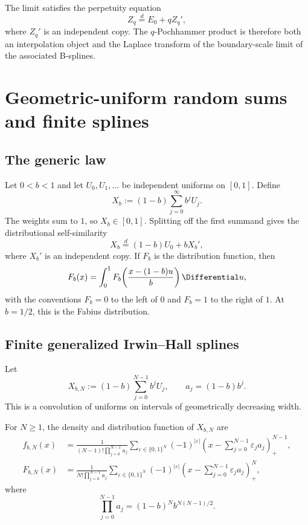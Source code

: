 \begin{remark}
The limit satisfies the perpetuity equation
\[
 Z_q\overset d=E_0+qZ_q',
\]
where $Z_q'$ is an independent copy.  The $q$-Pochhammer product is therefore
both an interpolation object and the Laplace transform of the boundary-scale
limit of the associated B-splines.
\end{remark}

\section{Geometric-uniform random sums and finite splines}
\label{g1:sec:uniform-sums}

\subsection{The generic law}

Let $0<b<1$ and let $U_0,U_1,\ldots$ be independent uniforms on $[0,1]$.
Define
\begin{equation}
 X_b:=(1-b)\sum_{j=0}^{\infty}b^jU_j.
 \label{g1:eq:Xb}
\end{equation}
The weights sum to $1$, so $X_b\in[0,1]$.  Splitting off the first summand gives
the distributional self-similarity
\begin{equation}
 X_b\overset d=(1-b)U_0+bX_b',
 \label{g1:eq:Xb-selfsimilar}
\end{equation}
where $X_b'$ is an independent copy.  If $F_b$ is the distribution function,
then
\begin{equation}
 F_b(x)=\int_0^1F_b\!\left(\frac{x-(1-b)u}{b}\right)\Differential u,
 \label{g1:eq:Fb-integral}
\end{equation}
with the conventions $F_b=0$ to the left of $0$ and $F_b=1$ to the right of
$1$.  At $b=1/2$, this is the Fabius distribution.

\subsection{Finite generalized Irwin--Hall splines}

Let
\[
 X_{b,N}:=(1-b)\sum_{j=0}^{N-1}b^jU_j,
 \qquad a_j=(1-b)b^j.
\]
This is a convolution of uniforms on intervals of geometrically decreasing
width.

\begin{theorem}
For $N\ge1$, the density and distribution function of $X_{b,N}$ are
\begin{align}
 f_{b,N}(x)
 &=\frac1{(N-1)!\prod_{j=0}^{N-1}a_j}
 \sum_{\varepsilon\in\{0,1\}^N}
 (-1)^{|\varepsilon|}
 \left(x-\sum_{j=0}^{N-1}\varepsilon_ja_j\right)_+^{N-1},
 \label{g1:eq:finite-density}\\
 F_{b,N}(x)
 &=\frac1{N!\prod_{j=0}^{N-1}a_j}
 \sum_{\varepsilon\in\{0,1\}^N}
 (-1)^{|\varepsilon|}
 \left(x-\sum_{j=0}^{N-1}\varepsilon_ja_j\right)_+^N,
 \label{g1:eq:finite-CDF}
\end{align}
where
\begin{equation}
 \prod_{j=0}^{N-1}a_j=(1-b)^Nb^{N(N-1)/2}.
 \label{g1:eq:product-widths}
\end{equation}
\end{theorem}

